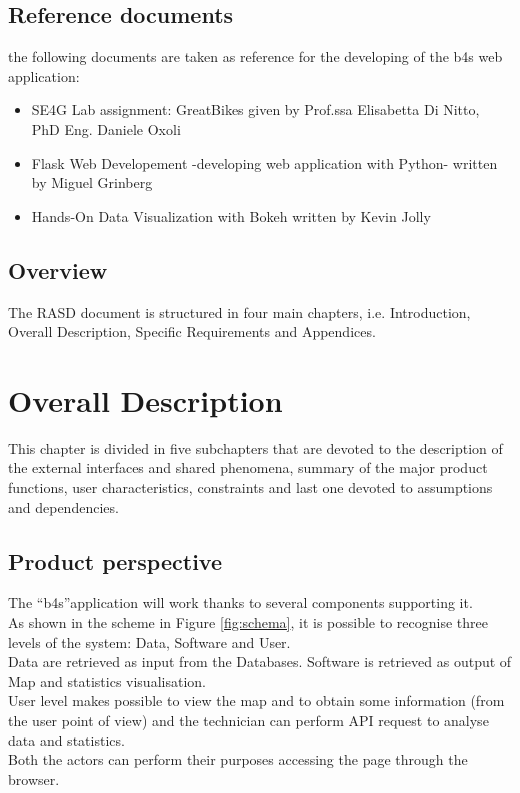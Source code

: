 \documentclass{article}
\begin{document}
\subsection{Reference documents}
the following documents are taken as reference for the developing of the b4s web application:
\begin{itemize}
    \item SE4G Lab assignment: GreatBikes given by Prof.ssa Elisabetta Di Nitto, PhD Eng. Daniele Oxoli
    \item Flask Web Developement -developing web application with Python- written by Miguel Grinberg
    \item Hands-On Data Visualization with Bokeh written by Kevin Jolly 
\end{itemize}


\subsection{Overview}
The RASD document is structured in four main chapters, i.e. Introduction, Overall Description, Specific Requirements and Appendices. 

\section{Overall Description}
This chapter is divided in five subchapters that are devoted to the description of the external interfaces and shared phenomena, summary of the major product functions, user characteristics, constraints and last one devoted to assumptions and dependencies.
\subsection{Product perspective}
The “b4s”application will work thanks to several components supporting it.\\ As shown in the scheme in Figure \ref{fig:schema}, it is possible to recognise three levels of the system: Data, Software and User.\\ 
Data are retrieved as input from the Databases.
Software is retrieved as output of Map and statistics visualisation.\\
User level makes possible to view the map and to obtain some information (from the user point of view) and the technician can perform API request to analyse data and statistics.\\ Both the actors can perform their purposes accessing the page through the browser.\\
\end{document}
